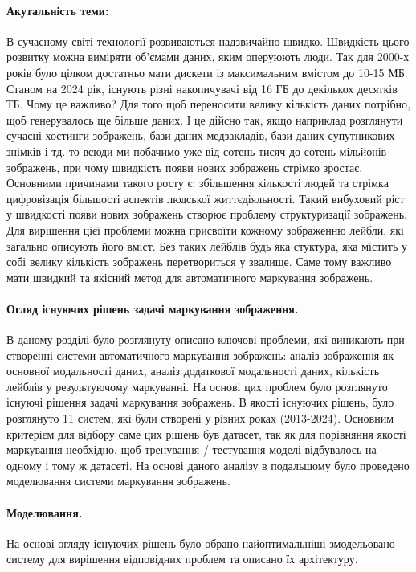 \documentclass{udstu}
\begin{document}
\paragraph{\textbf{Акутальність теми:}}
В сучасному світі технології розвиваються надзвичайно швидко. Швидкість цього розвитку можна виміряти
об'ємами даних, яким оперуюють люди. Так для 2000-х років було цілком достатньо мати дискети із максимальним вмістом
до 10-15 МБ. Станом на 2024 рік, існують різні накопичувачі від 16 ГБ до декількох десятків ТБ. Чому це важливо?
Для того щоб переносити велику кількість даних потрібно, щоб генерувалось ще більше даних. І це дійсно так, якщо
наприклад розглянути сучасні хостинги зображень, бази даних медзакладів, бази даних супутникових знімків і тд.
то всюди ми побачимо уже від сотень тисяч до сотень мільйонів зображень,
при чому швидкість появи нових зображень стрімко зростає. Основними причинами такого росту є: збільшення кількості людей
та стрімка цифровізація більшості аспектів людської життєдіяльності. Такий вибуховий ріст у швидкості
появи нових зображень створює проблему структуризації зображень. Для вирішення цієї проблеми можна присвоїти
кожному зображенню лейбли, які загально описують його вміст.
Без таких лейблів будь яка стуктура, яка містить у собі велику кількість зображень перетвориться
у звалище. Саме тому важливо мати швидкий та якісний метод для автоматичного маркування зображень.


\paragraph{\textbf{Огляд існуючих рішень задачі маркування зображення.}}
В даному розділі було розглянуту описано ключові проблеми,
які виникають при створенні системи автоматичного маркування зображень:
аналіз зображення як основної модальності даних, аналіз додаткової модальності даних,
кількість лейблів у результуючому маркуванні. На основі цих проблем було розглянуто існуючі рішення
задачі маркування зображень. В якості існуючих рішень, було розглянуто 11 систем, які були
створені у різних роках (2013-2024). Основним критерієм для відбору саме цих рішень був датасет, так як для
порівняння якості маркування необхідно, щоб тренування / тестування моделі відбувалось на одному і тому ж
датасеті. На основі даного аналізу в подальшому було проведено моделювання системи маркування зображень.

\paragraph{\textbf{Моделювання.}}
На основі огляду існуючих рішень було обрано найоптимальніші змодельовано систему
для вирішення відповідних проблем та описано їх архітектуру.
\end{document}
